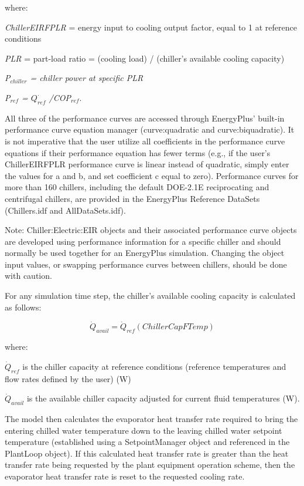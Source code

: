 where:

\emph{ChillerEIRFPLR} = energy input to cooling output factor, equal to 1 at reference conditions

\emph{PLR} = part-load ratio = (cooling load) / (chiller's available cooling capacity)

\emph{P\(_{chiller}\) = chiller power at specific PLR}

\emph{P\(_{ref}\) = \({Q^\cdot_{ref}}\) /COP\(_{ref}\)}.

All three of the performance curves are accessed through EnergyPlus' built-in performance curve equation manager (curve:quadratic and curve:biquadratic). It is not imperative that the user utilize all coefficients in the performance curve equations if their performance equation has fewer terms (e.g., if the user's ChillerEIRFPLR performance curve is linear instead of quadratic, simply enter the values for a and b, and set coefficient c equal to zero). Performance curves for more than 160 chillers, including the default DOE-2.1E reciprocating and centrifugal chillers, are provided in the EnergyPlus Reference DataSets (Chillers.idf and AllDataSets.idf).

Note: Chiller:Electric:EIR objects and their associated performance curve objects are developed using performance information for a specific chiller and should normally be used together for an EnergyPlus simulation. Changing the object input values, or swapping performance curves between chillers, should be done with caution.

For any simulation time step, the chiller's available cooling capacity is calculated as follows:

\begin{equation}
{\dot{Q}_{avail}} = {\dot{Q}_{ref}}\left( {ChillerCapFTemp} \right)
\end{equation}

where:

\(\dot{Q}_{ref}\) is the chiller capacity at reference conditions (reference temperatures and flow rates defined by the user) (W)

\(\dot{Q}_{avail}\) is the available chiller capacity adjusted for current fluid temperatures (W).

The model then calculates the evaporator heat transfer rate required to bring the entering chilled water temperature down to the leaving chilled water setpoint temperature (established using a SetpointManager object and referenced in the PlantLoop object). If this calculated heat transfer rate is greater than the heat transfer rate being requested by the plant equipment operation scheme, then the evaporator heat transfer rate is reset to the requested cooling rate.

